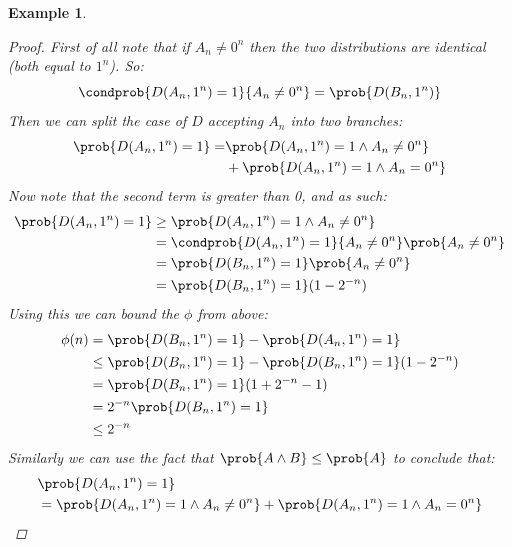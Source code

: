 \documentclass{article}
\newtheorem{example}{Example}
\begin{document}
\begin{example}
\begin{proof}
        First of all note that if $A_n \neq 0^n$ then the two distributions are identical (both equal to $1^n$). So:
        \[\condprob{D(A_n, 1^n) = 1}{ A_n \neq 0^n} = \prob{D(B_n, 1^n)} \]
        Then we can split the case of $D$ accepting $A_n$ into two branches:
        \begin{align*}
            \prob{D(A_n, 1^n) = 1} = & \prob{D(A_n, 1^n) = 1 \land A_n \neq 0^n} \\
                                     & + \prob{D(A_n, 1^n) = 1 \land A_n = 0^n}
        \end{align*}
        Now note that the second term is greater than 0, and as such:
        \begin{align*}
            \prob{D(A_n, 1^n) = 1} & \geq \prob{D(A_n, 1^n) = 1 \land A_n \neq 0^n}                 \\
                                   & = \condprob{D(A_n, 1^n) = 1}{A_n \neq 0^n} \prob{A_n \neq 0^n} \\
                                   & = \prob{D(B_n, 1^n) = 1} \prob{A_n \neq 0^n}                   \\
                                   & = \prob{D(B_n, 1^n) = 1} (1 - 2^{-n})                          \\
        \end{align*}
        Using this we can bound the $\phi$ from above:
        \begin{align*}
            \phi(n) & = \prob{D(B_n, 1^n) = 1} - \prob{D(A_n, 1^n) = 1}                  \\
                    & \leq  \prob{D(B_n, 1^n) = 1} - \prob{D(B_n, 1^n) = 1} (1 - 2^{-n}) \\
                    & = \prob{D(B_n, 1^n) = 1} (1 + 2^{-n} - 1)                          \\
                    & = 2^{-n} \prob{D(B_n, 1^n) = 1}                                    \\
                    & \leq 2^{-n}                                                        \\
        \end{align*}
        Similarly we can use the fact that $\prob{A \land B} \leq \prob{A}$ to conclude that:
        \begin{align*}
             & \prob{D(A_n, 1^n) = 1}                                                               \\
             & = \prob{D(A_n, 1^n) = 1 \land A_n \neq 0^n} + \prob{D(A_n, 1^n) = 1 \land A_n = 0^n} \\

\end{align*}
\end{proof}
\end{example}
\end{document}

